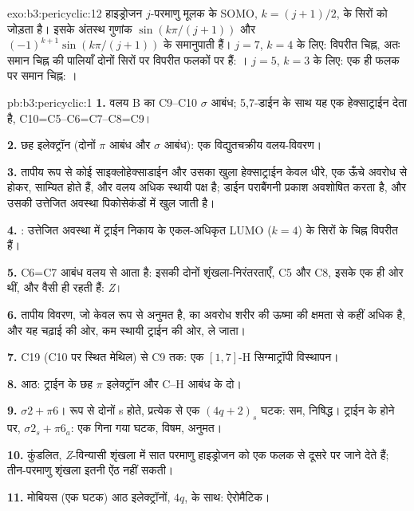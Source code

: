 \begin{solution}{exo:b3:pericyclic:12}
हाइड्रोजन $j$-परमाणु मूलक के SOMO, $k = (j + 1)/2$, के सिरों को जोड़ता है। इसके अंतस्थ
गुणांक $\sin(k\pi/(j + 1))$ और $(-1)^{k+1}\sin(k\pi/(j + 1))$ के समानुपाती हैं। $j = 7$, $k = 4$ के लिए: विपरीत चिह्न, अतः
समान चिह्न की पालियाँ दोनों सिरों पर विपरीत फलकों पर हैं: ।
$j = 5$, $k = 3$ के लिए: एक ही फलक पर समान चिह्न: ।
\end{solution}

\begin{solution}{pb:b3:pericyclic:1}
\textbf{1.} वलय B का C9--C10 $\sigma$ आबंध; 5,7-डाईन के साथ यह एक हेक्साट्राईन देता है,
C10=C5--C6=C7--C8=C9।

\textbf{2.} छह इलेक्ट्रॉन (दोनों $\pi$ आबंध और $\sigma$ आबंध): एक विद्युतचक्रीय वलय-विवरण।

\textbf{3.} तापीय रूप से कोई साइक्लोहेक्साडाईन और उसका खुला हेक्साट्राईन केवल
धीरे, एक ऊँचे अवरोध से होकर, साम्यित होते हैं, और वलय अधिक स्थायी पक्ष है;
डाईन पराबैंगनी प्रकाश अवशोषित करता है, और उसकी उत्तेजित अवस्था
पिकोसेकंडों में खुल जाती है।

\textbf{4.} : उत्तेजित अवस्था में ट्राईन
निकाय के एकल-अधिकृत LUMO ($k = 4$) के सिरों के चिह्न विपरीत हैं।

\textbf{5.} C6=C7 आबंध वलय से आता है: इसकी दोनों शृंखला-निरंतरताएँ, C5 और C8,
इसके एक ही ओर थीं, और वैसी ही रहती हैं: \textit{Z}।

\textbf{6.} तापीय विवरण, जो केवल  रूप से अनुमत है, का अवरोध शरीर की ऊष्मा की क्षमता से
कहीं अधिक है, और यह चढ़ाई की ओर, कम स्थायी ट्राईन की ओर, ले जाता।

\textbf{7.} C19 (C10 पर स्थित मेथिल) से C9 तक: एक $[1,7]$-H सिग्माट्रॉपी विस्थापन।

\textbf{8.} आठ: ट्राईन के छह $\pi$ इलेक्ट्रॉन और C--H आबंध के दो।

\textbf{9.} $\sigma2 + \pi6$।  रूप से दोनों s होते, प्रत्येक से एक $(4q + 2)_s$ घटक:
सम, निषिद्ध। ट्राईन के  होने पर, $\sigma2_s + \pi6_a$: एक गिना गया घटक, विषम,
अनुमत।

\textbf{10.} कुंडलित, \textit{Z}-विन्यासी शृंखला में सात परमाणु हाइड्रोजन को एक फलक से
दूसरे पर जाने देते हैं; तीन-परमाणु शृंखला इतनी ऐंठ नहीं सकती।

\textbf{11.} मोबियस (एक  घटक) आठ इलेक्ट्रॉनों, $4q$, के साथ: ऐरोमैटिक।


\end{solution}
